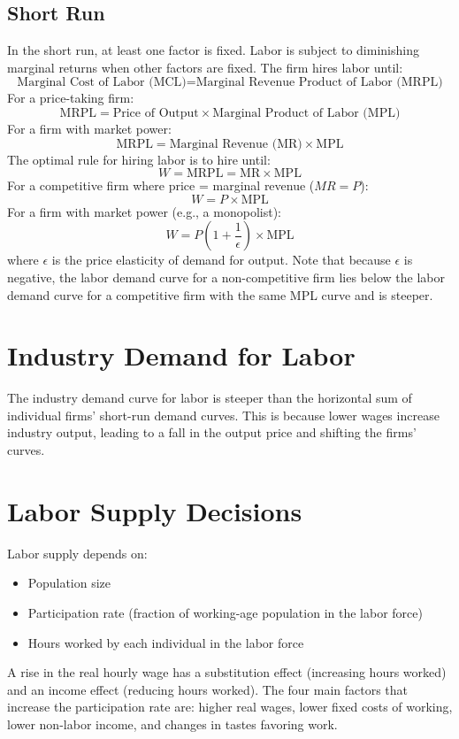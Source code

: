 \subsection*{Short Run}
In the short run, at least one factor is fixed. Labor is subject to diminishing marginal returns when other factors are fixed. The firm hires labor until:
\[
\text{Marginal Cost of Labor (MCL)} = \text{Marginal Revenue Product of Labor (MRPL)}
\]
For a price-taking firm:
\[
\text{MRPL} = \text{Price of Output} \times \text{Marginal Product of Labor (MPL)}
\]
For a firm with market power:
\[
\text{MRPL} = \text{Marginal Revenue (MR)} \times \text{MPL}
\]
The optimal rule for hiring labor is to hire until:
\[
W = \text{MRPL} = \text{MR} \times \text{MPL}
\]
For a competitive firm where price = marginal revenue (\(MR = P\)):
\[
W = P \times \text{MPL}
\]
For a firm with market power (e.g., a monopolist):
\[
W = P \left(1 + \frac{1}{\epsilon}\right) \times \text{MPL}
\]
where \(\epsilon\) is the price elasticity of demand for output. Note that because \(\epsilon\) is negative, the labor demand curve for a non-competitive firm lies below the labor demand curve for a competitive firm with the same MPL curve and is steeper.

\section*{Industry Demand for Labor}
The industry demand curve for labor is steeper than the horizontal sum of individual firms' short-run demand curves. This is because lower wages increase industry output, leading to a fall in the output price and shifting the firms' curves.

\section*{Labor Supply Decisions}
Labor supply depends on:
\begin{itemize}
    \item Population size
    \item Participation rate (fraction of working-age population in the labor force)
    \item Hours worked by each individual in the labor force
\end{itemize}

A rise in the real hourly wage has a substitution effect (increasing hours worked) and an income effect (reducing hours worked). The four main factors that increase the participation rate are: higher real wages, lower fixed costs of working, lower non-labor income, and changes in tastes favoring work.

